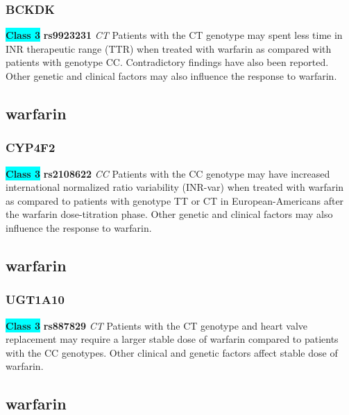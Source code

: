 \documentclass{book}
\begin{document}
\subsubsection{ BCKDK }

\begin{center}
\textbf{\colorbox{cyan} {Class 3}} \textbf{ rs9923231 } \textit{ CT }
Patients with the CT genotype may spent less time in INR therapeutic range (TTR) when treated with warfarin as compared with patients with genotype CC. Contradictory findings have also been reported. Other genetic and clinical factors may also influence the response to warfarin.


\end{center}\subsection{ warfarin }


\subsubsection{ CYP4F2 }

\begin{center}
\textbf{\colorbox{cyan} {Class 3}} \textbf{ rs2108622 } \textit{ CC }
Patients with the CC genotype may have increased international normalized ratio variability (INR-var) when treated with warfarin as compared to patients with genotype TT or CT in European-Americans after the warfarin dose-titration phase. Other genetic and clinical factors may also influence the response to warfarin.


\end{center}\subsection{ warfarin }


\subsubsection{ UGT1A10 }

\begin{center}
\textbf{\colorbox{cyan} {Class 3}} \textbf{ rs887829 } \textit{ CT }
Patients with the CT genotype and heart valve replacement may require a larger stable dose of warfarin compared to patients with the CC genotypes. Other clinical and genetic factors affect stable dose of warfarin.


\end{center}\subsection{ warfarin }
\end{document}
